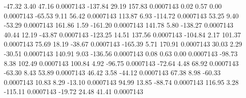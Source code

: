       -47.32        3.40       47.16     0.0007143
     -137.84       29.19      157.83     0.0007143
        0.02        0.57        0.00     0.0007143
      -65.53        9.11       56.42     0.0007143
      113.87        6.93     -114.72     0.0007143
       53.25        9.40      -53.29     0.0007143
      161.86        1.59     -161.20     0.0007143
      141.78        5.80     -138.27     0.0007143
       40.44       12.19      -43.87     0.0007143
     -123.25       14.51      137.56     0.0007143
     -104.84        2.17      101.37     0.0007143
       75.69       18.19      -38.67     0.0007143
     -165.39        5.71      170.91     0.0007143
       30.03        2.29      -30.51     0.0007143
      140.91        9.03     -136.56     0.0007143
        0.08        0.63        0.00     0.0007143
      -98.73        8.38      102.49     0.0007143
      100.84        4.92      -96.75     0.0007143
      -72.64        4.48       68.92     0.0007143
      -63.30        8.43       53.89     0.0007143
       46.42        3.58      -44.12     0.0007143
       67.38        8.98      -60.33     0.0007143
       10.83        8.29      -13.10     0.0007143
       94.99       13.85      -88.74     0.0007143
      116.95        3.28     -115.11     0.0007143
      -19.72       24.48       41.41     0.0007143
